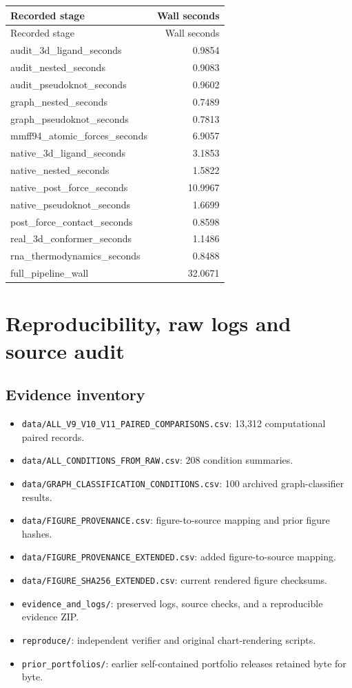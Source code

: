 \documentclass[11pt,a4paper]{article}
\begin{document}
\begin{center}\small\begin{longtable}{lr}
\toprule
Recorded stage & Wall seconds\\
\midrule
\endfirsthead
\toprule
Recorded stage & Wall seconds\\
\midrule
\endhead
audit\_3d\_ligand\_seconds & 0.9854\\
audit\_nested\_seconds & 0.9083\\
audit\_pseudoknot\_seconds & 0.9602\\
graph\_nested\_seconds & 0.7489\\
graph\_pseudoknot\_seconds & 0.7813\\
mmff94\_atomic\_forces\_seconds & 6.9057\\
native\_3d\_ligand\_seconds & 3.1853\\
native\_nested\_seconds & 1.5822\\
native\_post\_force\_seconds & 10.9967\\
native\_pseudoknot\_seconds & 1.6699\\
post\_force\_contact\_seconds & 0.8598\\
real\_3d\_conformer\_seconds & 1.1486\\
rna\_thermodynamics\_seconds & 0.8488\\
full\_pipeline\_wall & 32.0671\\
\bottomrule
\end{longtable}
\end{center}
\section{Reproducibility, raw logs and source audit}
\subsection{Evidence inventory}
\begin{itemize}[leftmargin=*]
\item \texttt{data/ALL\_V9\_V10\_V11\_PAIRED\_COMPARISONS.csv}: 13,312 computational paired records.
\item \texttt{data/ALL\_CONDITIONS\_FROM\_RAW.csv}: 208 condition summaries.
\item \texttt{data/GRAPH\_CLASSIFICATION\_CONDITIONS.csv}: 100 archived graph-classifier results.
\item \texttt{data/FIGURE\_PROVENANCE.csv}: figure-to-source mapping and prior figure hashes.
\item \texttt{data/FIGURE\_PROVENANCE\_EXTENDED.csv}: added figure-to-source mapping.
\item \texttt{data/FIGURE\_SHA256\_EXTENDED.csv}: current rendered figure checksums.
\item \texttt{evidence\_and\_logs/}: preserved logs, source checks, and a reproducible evidence ZIP.
\item \texttt{reproduce/}: independent verifier and original chart-rendering scripts.
\item \texttt{prior\_portfolios/}: earlier self-contained portfolio releases retained byte for byte.
\end{itemize}
\end{document}
